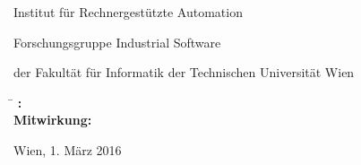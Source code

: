 \begin{otherlanguage}{ngerman}
\begin{center}
\begin{minipage}[t][2.5cm][t]{\textwidth}
  Institut f\"ur Rechnergest\"utzte Automation

  Forschungsgruppe Industrial Software

  der Fakult\"at f\"ur Informatik der Technischen Universit\"at Wien
\end{minipage}
\end{center}

\begin{minipage}[t][4cm][t]{\textwidth}%
  \vspace{0pt}\raggedright\thesistitlefontnormalsize\sffamily
  \begin{tabbing}%
	    \hspace{2.1cm} \= \hspace{6.6cm} \kill
	    \textbf{\tuinfthesisbetreuung:} \> \tuinfthesisbetreins\\
	    \ifAssistance
	    \textbf{Mitwirkung:} \> \tuinfthesisbetrzwei\\
	                \> \tuinfthesisbetrdrei
	    \fi
  \end{tabbing}
\end{minipage}

\begin{minipage}[t][1cm][t]{\textwidth}%
  \vspace{0pt}\sffamily\thesistitlefontnormalsize
  Wien, 1. März 2016
\end{minipage}


\end{otherlanguage}




\restoregeometry


